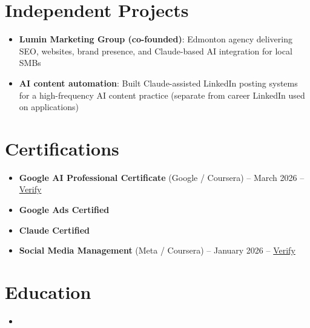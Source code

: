 \documentclass[11pt,a4paper,sans]{moderncv}
\begin{document}
\section{Independent Projects}
\vspace{1pt}
\begin{itemize}
\item \textbf{Lumin Marketing Group (co-founded)}: Edmonton agency delivering SEO, websites, brand presence, and Claude-based AI integration for local SMBs
\item \textbf{AI content automation}: Built Claude-assisted LinkedIn posting systems for a high-frequency AI content practice (separate from career LinkedIn used on applications)
\end{itemize}

\section{Certifications}
\vspace{1pt}
\begin{itemize}
\item \textbf{Google AI Professional Certificate} (Google / Coursera) -- March 2026 -- \href{https://www.coursera.org/account/accomplishments/verify/professional-cert/54E1P3RBHVL8}{Verify}
\item \textbf{Google Ads Certified}
\item \textbf{Claude Certified}
\item \textbf{Social Media Management} (Meta / Coursera) -- January 2026 -- \href{https://www.coursera.org/account/accomplishments/verify/7NOVGMU2L69G}{Verify}
\end{itemize}

\section{Education}
\vspace{1pt}
\begin{itemize}
\item{}
\end{itemize}
\end{document}
